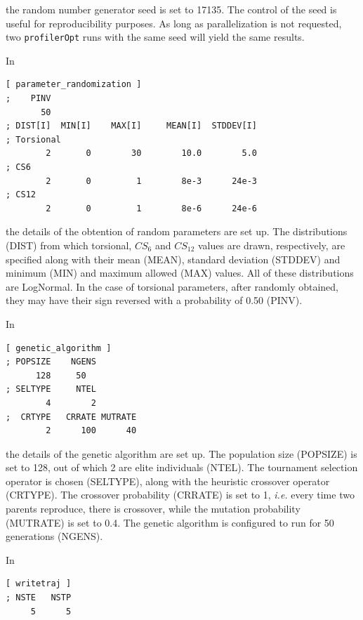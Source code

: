 \documentclass[10pt,a4paper]{report}
\numberwithin{equation}{section}
\newcommand{\profileropt}[0]{\texttt{profilerOpt}}
\begin{document}
\noindent the random number generator seed is set to 17135.
%
The control of the seed is useful for reproducibility purposes.
%
As long as parallelization is not requested, two \profileropt{} runs
with the same seed will yield the same results.

In

\begin{lstlisting}[language=gromacs]
[ parameter_randomization ]
;    PINV
       50
; DIST[I]  MIN[I]    MAX[I]     MEAN[I]  STDDEV[I]
; Torsional
        2       0        30        10.0        5.0 
; CS6
        2       0         1        8e-3      24e-3
; CS12
        2       0         1        8e-6      24e-6
\end{lstlisting}\vspace{-2ex}\par

\noindent the details of the obtention of random parameters are set
up.
%
The distributions (DIST) from which torsional, $CS_6$ and $CS_{12}$
values are drawn, respectively, are specified along with their mean
(MEAN), standard deviation (STDDEV) and minimum (MIN) and maximum
allowed (MAX) values.
%
All of these distributions are LogNormal.
%
In the case of torsional parameters, after randomly obtained, they may
have their sign reversed with a probability of 0.50 (PINV).

In 

\begin{lstlisting}[language=gromacs]
[ genetic_algorithm ]
; POPSIZE    NGENS
      128     50
; SELTYPE     NTEL
        4        2
;  CRTYPE   CRRATE MUTRATE
        2      100      40
\end{lstlisting}\vspace{-2ex}\par

\noindent the details of the genetic algorithm are set up.
%
The population size (POPSIZE) is set to 128, out of which 2 are elite
individuals (NTEL).
%
The tournament selection operator is chosen (SELTYPE), along with the
heuristic crossover operator (CRTYPE).
%
The crossover probability (CRRATE) is set to 1, \textit{i.e.} every
time two parents reproduce, there is crossover, while the mutation
probability (MUTRATE) is set to 0.4.
%
The genetic algorithm is configured to run for 50 generations (NGENS).

In

\begin{lstlisting}[language=gromacs]
[ writetraj ]
; NSTE   NSTP
     5      5
\end{lstlisting}\vspace{-2ex}\par
\end{document}
